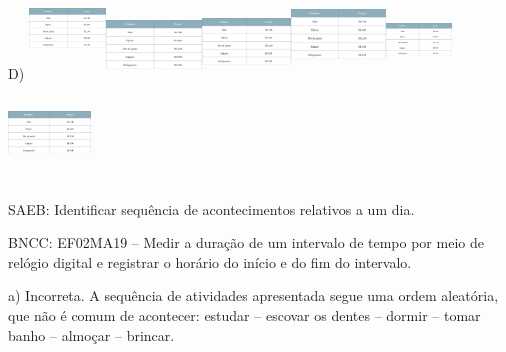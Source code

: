 \begin{escolha}
\begin{escolha}
{{{{{{{{D)
\includegraphics[width=0.80414in,height=1.05999in]{media/image148.png}\includegraphics[width=1.00005in,height=0.71336in]{media/image148.png}\includegraphics[width=0.92914in,height=0.77678in]{media/image148.png}\includegraphics[width=0.99167in,height=0.93413in]{media/image148.png}\includegraphics[width=0.68193in,height=0.81736in]{media/image148.png}\includegraphics[width=0.86664in,height=1.01803in]{media/image148.png}

SAEB: Identificar sequência de acontecimentos relativos a um
dia.

BNCC: EF02MA19 -- Medir a duração de um intervalo de tempo por meio de
relógio digital e registrar o horário do início e do fim do intervalo.

a) Incorreta. A sequência de atividades apresentada segue uma ordem
aleatória, que não é comum de acontecer: estudar -- escovar os dentes --
dormir -- tomar banho -- almoçar -- brincar.

}}}}}}}}
\end{escolha}
\end{escolha}
